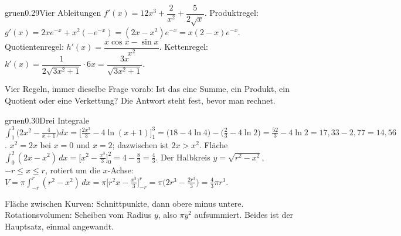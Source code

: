 \begin{loesungkarte}{gruen}{0.29}{Vier Ableitungen}
$f'(x) = 12x^{3} + \dfrac2{x^{2}} + \dfrac5{2\sqrt x}$.
Produktregel: $g'(x) = 2xe^{-x} + x^{2}(-e^{-x}) = (2x - x^{2})e^{-x} = x(2 - x)e^{-x}$.
Quotientenregel: $h'(x) = \dfrac{x\cos x - \sin x}{x^{2}}$.
Kettenregel: $k'(x) = \dfrac{1}{2\sqrt{3x^{2} + 1}}\cdot6x = \dfrac{3x}{\sqrt{3x^{2} + 1}}$.
\begin{mitnehmen}\kastentext
Vier Regeln, immer dieselbe Frage vorab: Ist das eine Summe, ein Produkt, ein Quotient oder eine Verkettung? Die Antwort steht fest, bevor man rechnet.
\end{mitnehmen}
\end{loesungkarte}

\begin{loesungkarte}{gruen}{0.30}{Drei Integrale}
$\int_1^{3}\bigl(2x^{2} - \tfrac4{x + 1}\bigr)dx = \bigl[\tfrac{2x^{3}}3 - 4\ln(x + 1)\bigr]_1^{3} = \bigl(18 - 4\ln4\bigr) - \bigl(\tfrac23 - 4\ln2\bigr) = \tfrac{52}3 - 4\ln2 = 17{,}33 - 2{,}77 = 14{,}56$.
$x^{2} = 2x$ bei $x = 0$ und $x = 2$; dazwischen ist $2x > x^{2}$. Fläche $\int_0^{2}(2x - x^{2})\,dx = \bigl[x^{2} - \tfrac{x^{3}}3\bigr]_0^{2} = 4 - \tfrac83 = \tfrac43$.
Der Halbkreis $y = \sqrt{r^{2} - x^{2}}$, $-r\le x\le r$, rotiert um die $x$-Achse: $V = \pi\int_{-r}^{r}(r^{2} - x^{2})\,dx = \pi\bigl[r^{2}x - \tfrac{x^{3}}3\bigr]_{-r}^{r} = \pi\bigl(2r^{3} - \tfrac{2r^{3}}3\bigr) = \tfrac43\pi r^{3}$.
\begin{mitnehmen}\kastentext
Fläche zwischen Kurven: Schnittpunkte, dann obere minus untere. Rotationsvolumen: Scheiben vom Radius $y$, also $\pi y^{2}$ aufsummiert. Beides ist der Hauptsatz, einmal angewandt.
\end{mitnehmen}
\end{loesungkarte}

